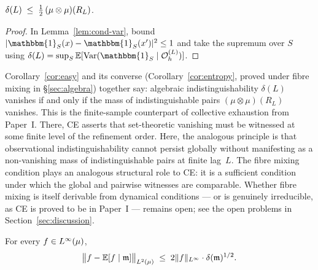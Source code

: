 \begin{corollary}
\label{cor:easy}
$\delta(L) \;\leq\; \tfrac{1}{2}\,(\mu \otimes \mu)(R_L)$.
\end{corollary}

\begin{proof}
In Lemma~\ref{lem:cond-var}, bound $|\mathbbm{1}_S(x) - \mathbbm{1}_S(x')|^2 \leq 1$
and take the supremum over $S$ using
$\deltaL = \sup_S \mathbb{E}[\mathrm{Var}(\mathbbm{1}_S \mid \OhL)]$.
\end{proof}

\begin{remark}
Corollary~\ref{cor:easy} and its converse (Corollary~\ref{cor:entropy}, proved
under fibre mixing in \S\ref{sec:algebra}) together say: algebraic
indistinguishability $\delta(L)$ vanishes if and only if the mass of
indistinguishable pairs $(\mu\otimes\mu)(R_L)$ vanishes.  This is the
finite-sample counterpart of collective exhaustion from Paper~I.  There, CE
asserts that set-theoretic vanishing must be witnessed at some finite level of
the refinement order.  Here, the analogous principle is that observational
indistinguishability cannot persist globally without manifesting as a
non-vanishing mass of indistinguishable pairs at finite lag~$L$.  The fibre
mixing condition plays an analogous structural role to CE: it is a sufficient
condition under which the global and pairwise witnesses are comparable.
Whether fibre mixing is itself derivable from dynamical conditions --- or is
genuinely irreducible, as CE is proved to be in Paper~I --- remains open;
see the open problems in Section~\ref{sec:discussion}.
\end{remark}

\begin{lemma}
\label{lem:bias}
For every $f \in L^{\infty}(\mu)$,
\[
  \bigl\| f - \mathbb{E}[f \mid \mathfrak{m}] \bigr\|_{L^{2}(\mu)}
  \;\leq\;
  2\|f\|_{L^{\infty}} \cdot \delta(\mathfrak{m})^{1/2}.
\]
\end{lemma}

